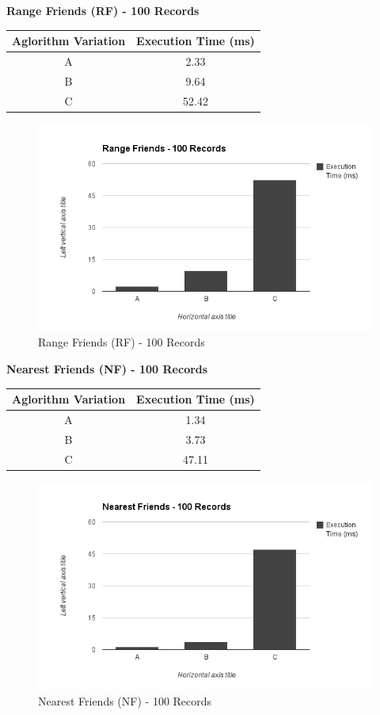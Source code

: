 \documentclass[prodmode,acmtods]{acmsmall} %
\begin{document}
\textbf{Range Friends (RF) - 100 Records}
\begin{tabular}{|c|c|}
\hline \rule[-2ex]{0pt}{5.5ex} Aglorithm Variation & Execution Time (ms) \\ 
\hline \rule[-2ex]{0pt}{5.5ex} A & 2.33 \\ 
\hline \rule[-2ex]{0pt}{5.5ex} B & 9.64 \\ 
\hline \rule[-2ex]{0pt}{5.5ex} C & 52.42 \\ 
\hline 
\end{tabular} 

\begin{figure}[h]
\centering
\includegraphics[width=0.7\linewidth]{./graphics/rf_100}
\caption{Range Friends (RF) - 100 Records}
\label{fig:nf_100}
\end{figure}


\textbf{Nearest Friends (NF) - 100 Records}
\begin{tabular}{|c|c|}
\hline \rule[-2ex]{0pt}{5.5ex} Aglorithm Variation & Execution Time (ms) \\ 
\hline \rule[-2ex]{0pt}{5.5ex} A & 1.34 \\ 
\hline \rule[-2ex]{0pt}{5.5ex} B & 3.73 \\ 
\hline \rule[-2ex]{0pt}{5.5ex} C & 47.11 \\ 
\hline 
\end{tabular} 

\begin{figure}[h]
\centering
\includegraphics[width=0.7\linewidth]{./graphics/nf_100}
\caption{Nearest Friends (NF) - 100 Records}
\label{fig:nf_100}
\end{figure}
\end{document}

